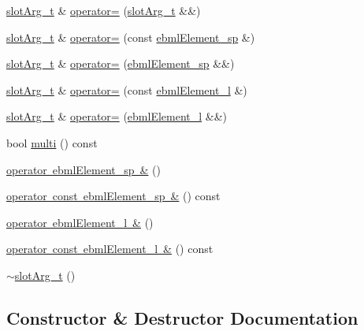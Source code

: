 \begin{DoxyCompactItemize}
\item 
\mbox{\hyperlink{classebml_1_1slotArg__t}{slot\+Arg\+\_\+t}} \& \mbox{\hyperlink{classebml_1_1slotArg__t_aeff50ae008a8002833d3baa52f22fd17}{operator=}} (\mbox{\hyperlink{classebml_1_1slotArg__t}{slot\+Arg\+\_\+t}} \&\&)
\item 
\mbox{\hyperlink{classebml_1_1slotArg__t}{slot\+Arg\+\_\+t}} \& \mbox{\hyperlink{classebml_1_1slotArg__t_a01e1399671dde26089dfd42528357de5}{operator=}} (const \mbox{\hyperlink{namespaceebml_adad533b7705a16bb360fe56380c5e7be}{ebml\+Element\+\_\+sp}} \&)
\item 
\mbox{\hyperlink{classebml_1_1slotArg__t}{slot\+Arg\+\_\+t}} \& \mbox{\hyperlink{classebml_1_1slotArg__t_a9f8040d5b36f81615059a9a8d41739de}{operator=}} (\mbox{\hyperlink{namespaceebml_adad533b7705a16bb360fe56380c5e7be}{ebml\+Element\+\_\+sp}} \&\&)
\item 
\mbox{\hyperlink{classebml_1_1slotArg__t}{slot\+Arg\+\_\+t}} \& \mbox{\hyperlink{classebml_1_1slotArg__t_a54036af9209665fea3f02b8c2822aea5}{operator=}} (const \mbox{\hyperlink{namespaceebml_a1ddadd26791f273d851882653b9caf70}{ebml\+Element\+\_\+l}} \&)
\item 
\mbox{\hyperlink{classebml_1_1slotArg__t}{slot\+Arg\+\_\+t}} \& \mbox{\hyperlink{classebml_1_1slotArg__t_ae7d90c0e339c51fc5c5422453dcc3d9b}{operator=}} (\mbox{\hyperlink{namespaceebml_a1ddadd26791f273d851882653b9caf70}{ebml\+Element\+\_\+l}} \&\&)
\item 
bool \mbox{\hyperlink{classebml_1_1slotArg__t_a4ad4a3ec18db484c30c4da595732c115}{multi}} () const
\item 
\mbox{\hyperlink{classebml_1_1slotArg__t_ad0da9203bac5e560fb2fc5314f75a49a}{operator ebml\+Element\+\_\+sp \&}} ()
\item 
\mbox{\hyperlink{classebml_1_1slotArg__t_aac0c66b2f856c712e6d5bb1c82764af1}{operator const ebml\+Element\+\_\+sp \&}} () const
\item 
\mbox{\hyperlink{classebml_1_1slotArg__t_a004e63b5e9bbe78b613c09c7b7e814d1}{operator ebml\+Element\+\_\+l \&}} ()
\item 
\mbox{\hyperlink{classebml_1_1slotArg__t_a21decdc348045decac411a84ecc4e6e6}{operator const ebml\+Element\+\_\+l \&}} () const
\item 
\mbox{\hyperlink{classebml_1_1slotArg__t_aa141995137dafb51f5041f04688ed276}{$\sim$slot\+Arg\+\_\+t}} ()
\end{DoxyCompactItemize}


\subsection{Constructor \& Destructor Documentation}
\mbox{\label{classebml_1_1slotArg__t_a59249e5f6cf0f643d4ebea7bc5f01e53}} 
